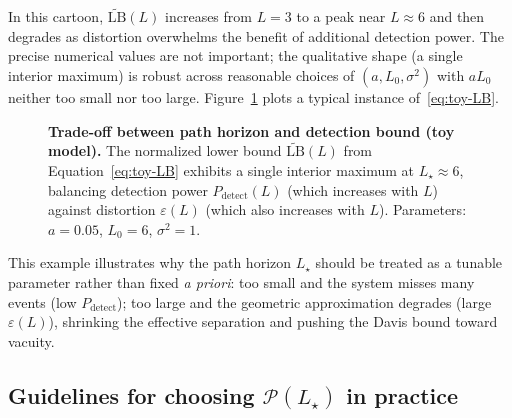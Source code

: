 \documentclass[11pt]{article}
\theoremstyle{remark}
\theoremstyle{plain}
\begin{document}
\begin{mdframed}[linewidth=0.6pt]
In this cartoon, $\widetilde{\mathrm{LB}}(L)$ increases from $L=3$ to a peak near $L \approx 6$ and then
degrades as distortion overwhelms the benefit of additional detection power. The precise numerical
values are not important; the qualitative shape (a single interior maximum) is robust across
reasonable choices of $(a, L_0, \sigma^2)$ with $aL_0$ neither too small nor too large. Figure~\ref{fig:path-horizon}
plots a typical instance of~\eqref{eq:toy-LB}.
\end{mdframed}

\begin{figure}[H]
\centering
{}
\caption{\textbf{Trade-off between path horizon and detection bound (toy model).} 
The normalized lower bound $\widetilde{\mathrm{LB}}(L)$ from 
Equation~\eqref{eq:toy-LB} exhibits a single interior maximum at 
$L_\star \approx 6$, balancing detection power $P_{\mathrm{detect}}(L)$ 
(which increases with $L$) against distortion $\varepsilon(L)$ (which also 
increases with $L$). Parameters: $a=0.05$, $L_0=6$, $\sigma^2=1$.}
\label{fig:path-horizon}
\end{figure}

This example illustrates why the path horizon $L_\star$ should be treated as a tunable parameter
rather than fixed \emph{a priori}: too small and the system misses many events (low
$P_{\mathrm{detect}}$); too large and the geometric approximation degrades (large $\varepsilon(L)$), shrinking
the effective separation and pushing the Davis bound toward vacuity.

\subsection{Guidelines for choosing $\mathcal{P}(L_\star)$ in practice}
\label{subsec:path-guidelines}
\end{document}
